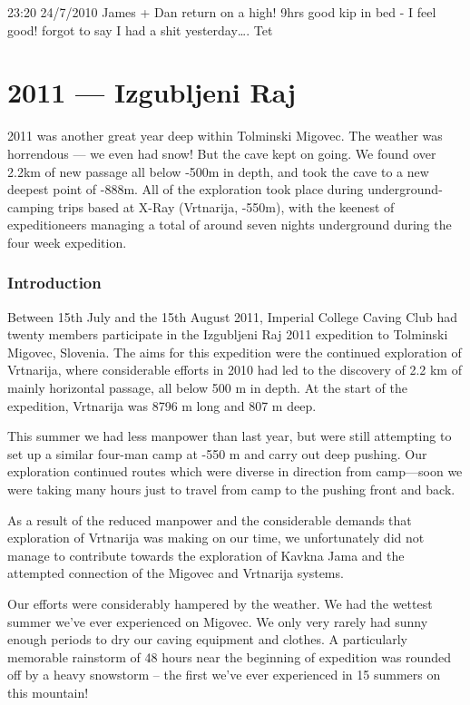 23:20 24/7/2010 James + Dan return on a high! 9hrs good kip in bed - I
feel good! forgot to say I had a shit yesterday\ldots{}. Tet

\chapter{2011 --- Izgubljeni Raj}

2011 was another great year deep within Tolminski Migovec. The weather
was horrendous --- we even had snow! But the cave kept on going. We
found over 2.2km of new passage all below -500m in depth, and took the
cave to a new deepest point of -888m. All of the exploration took place
during underground-camping trips based at X-Ray (Vrtnarija, -550m), with
the keenest of expeditioneers managing a total of around seven nights
underground during the four week expedition.

\subsection{Introduction}

Between 15th July and the 15th August 2011, Imperial College Caving Club
had twenty members participate in the Izgubljeni Raj 2011 expedition to
Tolminski Migovec, Slovenia. The aims for this expedition were the
continued exploration of Vrtnarija, where considerable efforts in 2010
had led to the discovery of 2.2 km of mainly horizontal passage, all
below 500 m in depth. At the start of the expedition, Vrtnarija was 8796
m long and 807 m deep.

This summer we had less manpower than last year, but were still
attempting to set up a similar four-man camp at -550 m and carry out
deep pushing. Our exploration continued routes which were diverse in
direction from camp---soon we were taking many hours just to travel from
camp to the pushing front and back.

As a result of the reduced manpower and the considerable demands that
exploration of Vrtnarija was making on our time, we unfortunately did
not manage to contribute towards the exploration of Kavkna Jama and the
attempted connection of the Migovec and Vrtnarija systems.

Our efforts were considerably hampered by the weather. We had the
wettest summer we've ever experienced on Migovec. We only very rarely
had sunny enough periods to dry our caving equipment and clothes. A
particularly memorable rainstorm of 48 hours near the beginning of
expedition was rounded off by a heavy snowstorm -- the first we've ever
experienced in 15 summers on this mountain!

